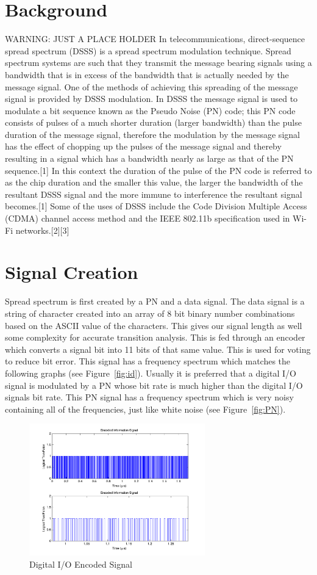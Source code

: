 \documentclass[journal]{IEEEtran}
\begin{document}
\section{Background}
WARNING: JUST A PLACE HOLDER
In telecommunications, direct-sequence spread spectrum (DSSS) is a spread spectrum modulation technique. Spread spectrum systems are such that they transmit the message bearing signals using a bandwidth that is in excess of the bandwidth that is actually needed by the message signal. One of the methods of achieving this spreading of the message signal is provided by DSSS modulation. In DSSS the message signal is used to modulate a bit sequence known as the Pseudo Noise (PN) code; this PN code consists of pulses of a much shorter duration (larger bandwidth) than the pulse duration of the message signal, therefore the modulation by the message signal has the effect of chopping up the pulses of the message signal and thereby resulting in a signal which has a bandwidth nearly as large as that of the PN sequence.[1] In this context the duration of the pulse of the PN code is referred to as the chip duration and the smaller this value, the larger the bandwidth of the resultant DSSS signal and the more immune to interference the resultant signal becomes.[1] Some of the uses of DSSS include the Code Division Multiple Access (CDMA) channel access method and the IEEE 802.11b specification used in Wi-Fi networks.[2][3]

\section{Signal Creation}
Spread spectrum is first created by a PN and a data signal. The data signal is a string of character created into an array of 8 bit binary number combinations based on the ASCII value of the characters. This gives our signal length as well some complexity for accurate transition analysis. This is fed through an encoder which converts a signal bit into 11 bits of that same value. This is used for voting to reduce bit error. This signal has a frequency spectrum which matches the following graphs (see Figure~\ref{fig:id}). Usually it is preferred that a digital I/O signal is modulated by a PN whose bit rate is much higher than the digital I/O signals bit rate. This PN signal has a frequency spectrum which is very noisy containing all of the frequencies, just like white noise (see Figure~\ref{fig:PN}).\\

\begin{figure}[h!]
\centering
\includegraphics[width=3in]{encoded_signal.png}
\caption{Digital I/O Encoded Signal}
\label{fig:dio}
\end{figure}
\end{document}
